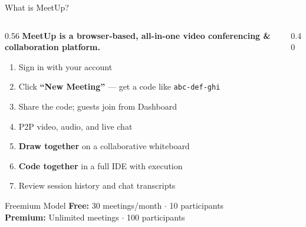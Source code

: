 \documentclass[aspectratio=169, 12pt]{beamer}
\begin{document}
\begin{frame}{What is MeetUp?}
  \begin{columns}[T]
    \begin{column}{0.56\textwidth}
      \vspace{0.4em}
      {\large\bfseries MeetUp is a browser-based, all-in-one video conferencing \& collaboration platform.}

      \vspace{0.7em}
      \begin{enumerate}\setlength{\itemsep}{0.45em}
        \item Sign in with your account
        \item Click \textbf{``New Meeting''} --- get a code like \texttt{abc-def-ghi}
        \item Share the code; guests join from Dashboard
        \item P2P video, audio, and live chat
        \item \textbf{Draw together} on a collaborative whiteboard
        \item \textbf{Code together} in a full IDE with execution
        \item Review session history and chat transcripts
      \end{enumerate}

      \vspace{0.6em}
      \begin{exampleblock}{Freemium Model}
        \footnotesize
        \textbf{Free:} 30 meetings/month $\cdot$ 10 participants\\
        \textbf{Premium:} Unlimited meetings $\cdot$ 100 participants
      \end{exampleblock}
    \end{column}

    \begin{column}{0.40\textwidth}
      \vspace{0.3em}
\end{column}
\end{columns}
\end{frame}
\end{document}
